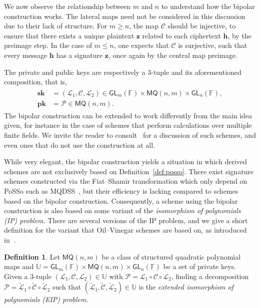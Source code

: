 \documentclass[draft, 12pt, a4paper, oneside]{memoir}
\theoremstyle{definition}
\newtheorem{definition}[theorem]{Definition}
\begin{document}
We now observe the relationship between $m$ and $n$ to understand how the bipolar construction works. The lateral maps need not be considered in this discussion due to their lack of structure. For $m \geq n$, the map $\mathcal{C}$ should be injective, to ensure that there exists a unique plaintext $\mathbf{z}$ related to each ciphertext $\mathbf{h}$, by the preimage step. In the case of $m \leq n$, one expects that $\mathcal{C}$ is surjective, such that every message $\mathbf{h}$ has a signature $\mathbf{z}$, once again by the central map preimage.

The private and public keys are respectively a $3$-tuple and its aforementioned composition, that is,
\begin{align}
  \begin{split}
    \mathbf{sk} &= (\mathcal{L}_{1}, \mathcal{C}, \mathcal{L}_{2}) 
      \in \mathsf{GL}_{m}(\mathbb{F}) \times \mathsf{MQ}(n, m) \times \mathsf{GL}_{n}(\mathbb{F}), \\
    \mathbf{pk} &= \mathcal{P} \in \mathsf{MQ}(n, m).
  \end{split}
\end{align}
The bipolar construction can be extended to work differently from the main idea given, for instance in the case of schemes that perform calculations over multiple finite fields. We invite the reader to consult~\cite[Section 2.2]{Petzoldt:201307} for a discussion of such schemes, and even ones that do not use the construction at all.

While very elegant, the bipolar construction yields a situation in which derived schemes are not exclusively based on Definition~\ref{def:posso}. There exist signature schemes constructed via the Fiat--Shamir transformation which only depend on \textsf{PoSSo} such as MQDSS~\cite{Chen:201612}, but their efficiency is lacking compared to schemes based on the bipolar construction. Consequently, a scheme using the bipolar construction is also based on some variant of the \emph{isomorphism of polynomials (IP) problem}. There are several versions of the IP problem, and we give a short definition for the variant that Oil--Vinegar schemes are based on, as introduced in~\cite{Ding:200806}.

\begin{definition}\label{def:eip}
  Let $\overline{\mathsf{MQ}}(n, m)$ be a class of structured quadratic polynomial maps and $\mathbb{U} = \mathsf{GL}_{m}(\mathbb{F}) \times \overline{\mathsf{MQ}}(n, m) \times \mathsf{GL}_{n}(\mathbb{F})$ be a set of private keys. Given a $3$-tuple $(\mathcal{L}_{1}, \mathcal{C}, \mathcal{L}_{2}) \in \mathbb{U}$ with $\mathcal{P} = \mathcal{L}_{1} \circ \mathcal{C} \circ \mathcal{L}_{2}$, finding a decomposition $\mathcal{P} = \widetilde{\mathcal{L}}_{1} \circ \widetilde{\mathcal{C}} \circ \widetilde{\mathcal{L}}_{2}$ such that $(\widetilde{\mathcal{L}}_{1}, \widetilde{\mathcal{C}}, \widetilde{\mathcal{L}}_{2}) \in \mathbb{U}$ is the \emph{extended isomorphism of polynomials (EIP) problem}.
\end{definition}
\end{document}
